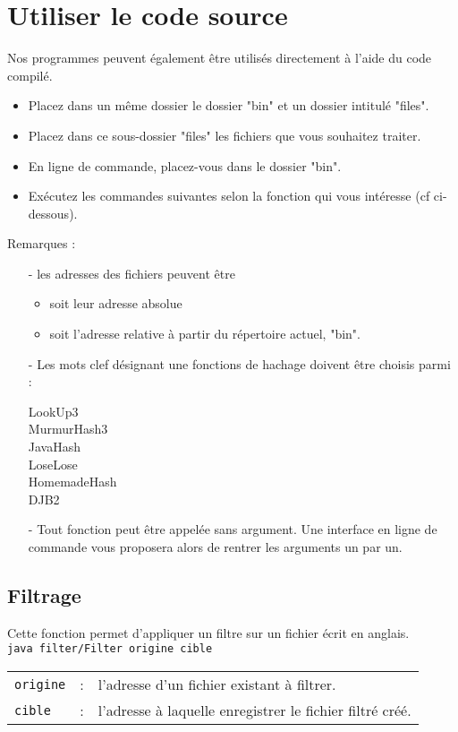 \documentclass[12pt,a4paper,titlepage]{article}
\newcommand{\code}[1]{ \texttt{\footnotesize #1} }
\begin{document}
\section{Utiliser le code source}
Nos programmes peuvent également être utilisés directement à l'aide du code compilé.
\begin{itemize}
\item Placez dans un même dossier le dossier "bin" et un dossier intitulé "files".
\item Placez dans ce sous-dossier "files" les fichiers que vous souhaitez traiter.
\item En ligne de commande, placez-vous dans le dossier "bin".
\item Exécutez les commandes suivantes selon la fonction qui vous intéresse (cf ci-dessous).
\end{itemize}

Remarques :
\begin{itemize}
\item[-] les adresses des fichiers peuvent être
	\begin{itemize}
	\item soit leur adresse absolue
	\item soit l'adresse relative à partir du répertoire actuel, "bin".
	\end{itemize}
\item[-] Les mots clef désignant une fonctions de hachage doivent être choisis parmi :
	\begin{center}
	LookUp3 \\
	MurmurHash3 \\
	JavaHash \\
	LoseLose \\
	HomemadeHash \\
	DJB2
	\end{center}
\item[-] Tout fonction peut être appelée sans argument. Une interface en ligne de commande vous proposera alors de rentrer les arguments un par un.
\end{itemize}



\subsection{Filtrage}
Cette fonction permet d'appliquer un filtre sur un fichier écrit en anglais.\\
\indent\indent\code{java filter/Filter origine cible}\\
\begin{tabular}{lcl}
\code{origine} &:& l'adresse d'un fichier existant à filtrer.\\
\code{cible} &:& l'adresse à laquelle enregistrer le fichier filtré créé.
\end{tabular}\\
\end{document}

